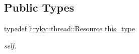 \subsection*{Public Types}
\begin{DoxyCompactItemize}
\item 
\hypertarget{classhryky_1_1thread_1_1_resource_a35e0b5a88467f7f16afece383f7569b3}{typedef \hyperlink{classhryky_1_1thread_1_1_resource}{hryky\-::thread\-::\-Resource} \hyperlink{classhryky_1_1thread_1_1_resource_a35e0b5a88467f7f16afece383f7569b3}{this\-\_\-type}}\label{classhryky_1_1thread_1_1_resource_a35e0b5a88467f7f16afece383f7569b3}

\begin{DoxyCompactList}\small\item\em self. \end{DoxyCompactList}\end{DoxyCompactItemize}
